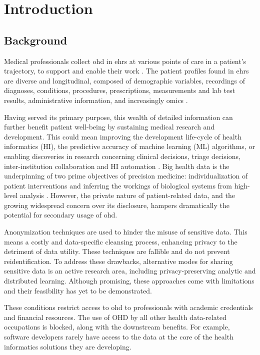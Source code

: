 \section{Introduction}
    \subsection{Background}
        Medical professionals collect \gls{ohd} in \glspl{ehr} at various points of care in a patient’s trajectory, to support and enable their work \cite{Cowie_2016}. The patient profiles found in \glspl{ehr} are diverse and longitudinal, composed of demographic variables, recordings of diagnoses, conditions, procedures, prescriptions, measurements and lab test results, administrative information, and increasingly omics \cite{Ohdsi2020-vf}.\par
        Having served its primary purpose, this wealth of detailed information can further benefit patient well-being by sustaining medical research and development. This could mean improving the development life-cycle of health informatics (HI), the predictive accuracy of machine learning (ML) algorithms, or enabling discoveries in research concerning clinical decisions, triage decisions, inter-institution collaboration and HI automation \cite{Rudin_2020}. Big health data is the underpinning of two prime objectives of precision medicine: individualization of patient interventions and inferring the workings of biological systems from high-level analysis \cite{Capobianco2020}. However, the private nature of patient-related data, and the growing widespread concern over its disclosure, hampers dramatically the potential for secondary usage of \gls{ohd}.\par
        
        Anonymization techniques are used to hinder the misuse of sensitive data. This means a costly and data-specific cleansing process, enhancing privacy to the detriment of data utility.  These techniques are fallible and do not prevent reidentification. To address these drawbacks, alternative modes for sharing sensitive data is an active research area, including privacy-preserving analytic and distributed learning. Although promising, these approaches come with limitations and their feasibility has yet to be demonstrated.\par
        These conditions restrict access to \gls{ohd} to professionals with academic credentials and financial resources. The use of OHD by all other health data-related occupations is blocked, along with the downstream benefits. For example, software developers rarely have access to the data at the core of the health informatics solutions they are developing.
        
